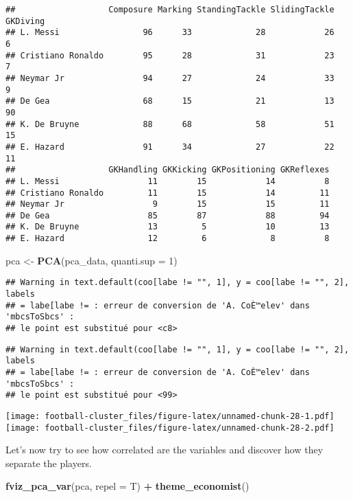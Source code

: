 \documentclass[]{article}
\newenvironment{Shaded}{\begin{snugshade}}{\end{snugshade}}
\newcommand{\DataTypeTok}[1]{\textcolor[rgb]{0.13,0.29,0.53}{#1}}
\newcommand{\DecValTok}[1]{\textcolor[rgb]{0.00,0.00,0.81}{#1}}
\newcommand{\KeywordTok}[1]{\textcolor[rgb]{0.13,0.29,0.53}{\textbf{#1}}}
\newcommand{\NormalTok}[1]{#1}
\newcommand{\OperatorTok}[1]{\textcolor[rgb]{0.81,0.36,0.00}{\textbf{#1}}}
\newcommand{\StringTok}[1]{\textcolor[rgb]{0.31,0.60,0.02}{#1}}
\begin{document}
\begin{verbatim}
##                   Composure Marking StandingTackle SlidingTackle GKDiving
## L. Messi                 96      33             28            26        6
## Cristiano Ronaldo        95      28             31            23        7
## Neymar Jr                94      27             24            33        9
## De Gea                   68      15             21            13       90
## K. De Bruyne             88      68             58            51       15
## E. Hazard                91      34             27            22       11
##                   GKHandling GKKicking GKPositioning GKReflexes
## L. Messi                  11        15            14          8
## Cristiano Ronaldo         11        15            14         11
## Neymar Jr                  9        15            15         11
## De Gea                    85        87            88         94
## K. De Bruyne              13         5            10         13
## E. Hazard                 12         6             8          8
\end{verbatim}

\begin{Shaded}
\begin{Highlighting}[]
\NormalTok{pca <-}\StringTok{ }\KeywordTok{PCA}\NormalTok{(pca_data, }\DataTypeTok{quanti.sup =} \DecValTok{1}\NormalTok{)}
\end{Highlighting}
\end{Shaded}

\begin{verbatim}
## Warning in text.default(coo[labe != "", 1], y = coo[labe != "", 2], labels
## = labe[labe != : erreur de conversion de 'A. CoÈ™elev' dans 'mbcsToSbcs' :
## le point est substitué pour <c8>
\end{verbatim}

\begin{verbatim}
## Warning in text.default(coo[labe != "", 1], y = coo[labe != "", 2], labels
## = labe[labe != : erreur de conversion de 'A. CoÈ™elev' dans 'mbcsToSbcs' :
## le point est substitué pour <99>
\end{verbatim}

\texttt{[image: football-cluster\_files/figure-latex/unnamed-chunk-28-1.pdf]}
\texttt{[image: football-cluster\_files/figure-latex/unnamed-chunk-28-2.pdf]}

Let's now try to see how correlated are the variables and discover how
they separate the players.

\begin{Shaded}
\begin{Highlighting}[]
\KeywordTok{fviz_pca_var}\NormalTok{(pca, }\DataTypeTok{repel =}\NormalTok{ T) }\OperatorTok{+}\StringTok{ }\KeywordTok{theme_economist}\NormalTok{()}
\end{Highlighting}
\end{Shaded}
\end{document}
